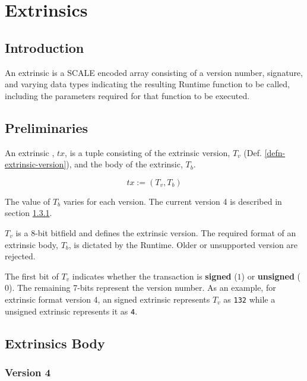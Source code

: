 \newpage
\chapter{Extrinsics}

\section{Introduction}

An extrinsic is a SCALE encoded array consisting of a version number,
signature, and varying data types indicating the resulting Runtime function to
be called, including the parameters required for that function to be executed.
\newline

\section{Preliminaries}

\begin{definition}
    An extrinsic , $tx$, is a tuple consisting of the extrinsic version,
    $T_v$ (Def. \ref{defn-extrinsic-version}), and the body of the extrinsic, $T_b$.

    \[
        tx := (T_v, T_b)
    \]

    The value of $T_b$ varies for each version. The current version 4 is
    described in section \ref{sect-version-four}.
\end{definition}

\begin{definition}
    \label{defn-extrinsic-version}
    $T_v$ is a 8-bit bitfield and defines the extrinsic version. The required
    format of an extrinsic body, $T_b$, is dictated by the Runtime. Older or
    unsupported version are rejected.
    \newline

    The first bit of $T_v$ indicates whether the transaction is \textbf{signed}
    ($1$) or \textbf{unsigned} ($0$). The remaining 7-bits represent the version
    number. As an example, for extrinsic format version 4, an signed extrinsic
    represents $T_v$ as \verb|132| while a unsigned extrinsic represents it as
    \verb|4|.
\end{definition}

\section{Extrinsics Body}

\subsection{Version 4}
\label{sect-version-four}

